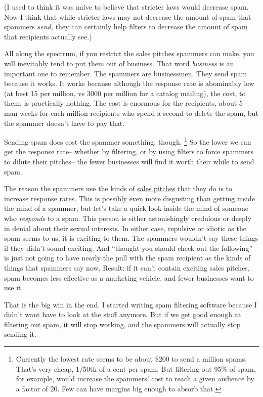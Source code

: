 (I used to think it was naive to believe that stricter laws would
decrease spam. Now I think that while stricter laws may not decrease the
amount of spam that spammers \emph{send,} they can certainly help
filters to decrease the amount of spam that recipients actually see.)

All along the spectrum, if you restrict the sales pitches spammers can
make, you will inevitably tend to put them out of business. That word
\emph{business} is an important one to remember. The spammers are
businessmen. They send spam because it works. It works because although
the response rate is abominably low (at best 15 per million, vs 3000 per
million for a catalog mailing), the cost, to them, is practically
nothing. The cost is enormous for the recipients, about 5 man-weeks for
each million recipients who spend a second to delete the spam, but the
spammer doesn't have to pay that.

Sending spam does cost the spammer something, though. \footnote{Currently the lowest rate seems to be about \$200 to send a
million spams. That's very cheap, 1/50th of a cent per spam. But
filtering out 95\% of spam, for example, would increase the spammers'
cost to reach a given audience by a factor of 20. Few can have margins
big enough to absorb that.} So the
lower we can get the response rate-- whether by filtering, or by using
filters to force spammers to dilute their pitches-- the fewer businesses
will find it worth their while to send spam.

The reason the spammers use the kinds of
\href{http://www.milliondollaremails.com}{sales pitches} that they do is
to increase response rates. This is possibly even more disgusting than
getting inside the mind of a spammer, but let's take a quick look inside
the mind of someone who \emph{responds} to a spam. This person is either
astonishingly credulous or deeply in denial about their sexual
interests. In either case, repulsive or idiotic as the spam seems to us,
it is exciting to them. The spammers wouldn't say these things if they
didn't sound exciting. And ``thought you should check out the
following'' is just not going to have nearly the pull with the spam
recipient as the kinds of things that spammers say now. Result: if it
can't contain exciting sales pitches, spam becomes less effective as a
marketing vehicle, and fewer businesses want to use it.

That is the big win in the end. I started writing spam filtering
software because I didn't want have to look at the stuff anymore. But if
we get good enough at filtering out spam, it will stop working, and the
spammers will actually stop sending it.

